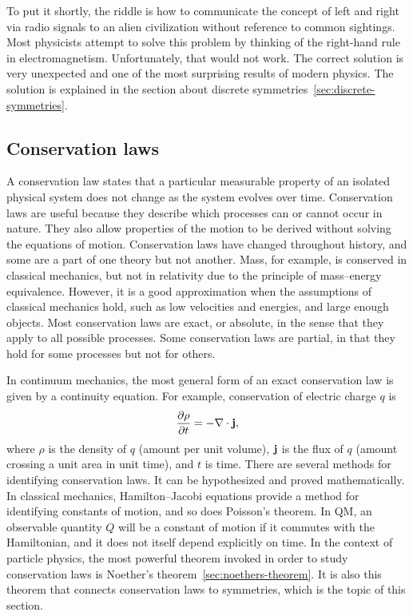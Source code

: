 To put it shortly, the riddle is how to communicate the concept of left and right via radio signals to an alien civilization without reference to common sightings. Most physicists attempt to solve this problem by thinking of the right-hand rule in electromagnetism. Unfortunately, that would not work. The correct solution is very unexpected and one of the most surprising results of modern physics. The solution is explained in the section about discrete symmetries~\ref{sec:discrete-symmetries}.

\subsection{Conservation laws}

A conservation law states that a particular measurable property of an isolated physical system does not change as the system evolves over time. Conservation laws are useful because they describe which processes can or cannot occur in nature. They also allow properties of the motion to be derived without solving the equations of motion. Conservation laws have changed throughout history, and some are a part of one theory but not another. Mass, for example, is conserved in classical mechanics, but not in relativity due to the principle of mass–energy equivalence. However, it is a good approximation when the assumptions of classical mechanics hold, such as low velocities and energies, and large enough objects. Most conservation laws are exact, or absolute, in the sense that they apply to all possible processes. Some conservation laws are partial, in that they hold for some processes but not for others.

In continuum mechanics, the most general form of an exact conservation law is given by a continuity equation. For example, conservation of electric charge $q$ is
\begin{equation}
\pdv{\rho}{t}=-\nabla\cdot\vb{j},
\end{equation}
where $\rho$ is the density of $q$ (amount per unit volume), $\vb{j}$ is the flux of $q$ (amount crossing a unit area in unit time), and $t$ is time. There are several methods for identifying conservation laws. It can be hypothesized and proved mathematically. In classical mechanics, Hamilton–Jacobi equations provide a method for identifying constants of motion, and so does Poisson's theorem. In QM, an observable quantity $Q$ will be a constant of motion if it commutes with the Hamiltonian, and it does not itself depend explicitly on time. In the context of particle physics, the most powerful theorem invoked in order to study conservation laws is Noether's theorem~\ref{sec:noethers-theorem}. It is also this theorem that connects conservation laws to symmetries, which is the topic of this section.

